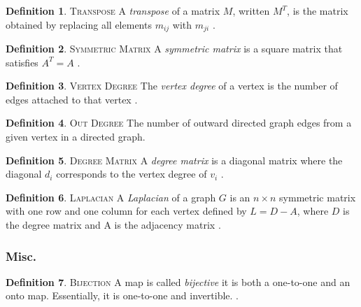 \documentclass[11pt]{article}
\theoremstyle{definition}
\newtheorem{definition}{Definition}[section]
\begin{document}
	\theoremstyle{definition}
	\begin{definition}{\textsc{Transpose}}
		A \emph{transpose} of a matrix $M$, written $M^T$, is the matrix obtained by replacing all elements $m_{ij}$ with $m_{ji}$ \cite{mathworld:Transpose}.
	\end{definition}
	
	\theoremstyle{definition}
	\begin{definition}{\textsc{Symmetric Matrix}}
		A \emph{symmetric matrix} is a square matrix that satisfies $A^T = A$ \cite{mathworld:SymmetricMatrix}.
	\end{definition}
	
	\theoremstyle{definition}
	\begin{definition}{\textsc{Vertex Degree}}
		The \emph{vertex degree} of a vertex is the number of edges attached to that vertex \cite{mathworld:VertexDegree}.
	\end{definition}
	
	\theoremstyle{definition}
	\begin{definition}{\textsc{Out Degree}}
		The number of outward directed graph edges from a given vertex in a directed graph.
	\end{definition}
	
	\theoremstyle{definition}
	\begin{definition}{\textsc{Degree Matrix}}
		A \emph{degree matrix} is a diagonal matrix where the diagonal $d_i$ corresponds to the vertex degree of $v_i$ \cite{mathworld:DegreeMatrix}. 
	\end{definition}
	
	\theoremstyle{definition}
	\begin{definition}{\textsc{Laplacian}}
		A \emph{Laplacian} of a graph $G$ is an $n \times n$ symmetric matrix with one row and one column for each vertex defined by $L = D - A$, where $D$ is the degree matrix and A is the adjacency matrix \cite{mathworld:Laplacian}.
	\end{definition}

\subsubsection{Misc.}
	\theoremstyle{definition}
	\begin{definition}{\textsc{Bijection}}
		A map is called \emph{bijective} it is both a one-to-one and an onto map. 
		Essentially, it is one-to-one and invertible. \cite{mathworld:Bijection}. 
	\end{definition}
	
\end{document}
